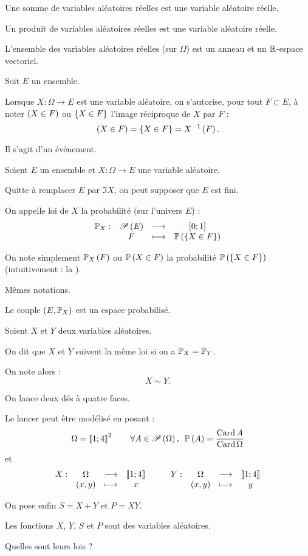 \begin{rem}
Une somme de variables aléatoires réelles est une variable aléatoire réelle.

Un produit de variables aléatoires réelles est une variable aléatoire réelle.

L'ensemble des variables aléatoires réelles (sur \(\Omega\)) est un anneau et un \(\R\)-espace vectoriel.
\end{rem}

\begin{nota}
Soit \(E\) un ensemble.

Lorsque \(X:\Omega\to E\) est une variable aléatoire, on s'autorise, pour tout \(F\subset E\), à noter \(\paren{X\in F}\) ou \(\accol{X\in F}\) l'image réciproque de \(X\) par \(F\) : \[\paren{X\in F}=\accol{X\in F}=X\inv\paren{F}.\]

Il s'agit d'un événement.
\end{nota}

\begin{defi}
Soient \(E\) un ensemble et \(X:\Omega\to E\) une variable aléatoire.

Quitte à remplacer \(E\) par \(\Im X\), on peut supposer que \(E\) est fini.

On appelle loi de \(X\) la probabilité (sur l'univers \(E\)) : \[\fonction{\prem_X}{\P{E}}{\intervii{0}{1}}{F}{\proba{\accol{X\in F}}}\]

On note simplement \(\probacond{F}{X}\) ou \(\proba{X\in F}\) la probabilité \(\proba{\accol{X\in F}}\) (intuitivement : la ).
\end{defi}

\begin{rem}
Mêmes notations.

Le couple \(\groupe{E}[\prem_X]\) est un espace probabilisé.
\end{rem}

\begin{defi}
Soient \(X\) et \(Y\) deux variables aléatoires.

On dit que \(X\) et \(Y\) suivent la même loi si on a \(\prem_X=\prem_Y\).

On note alors : \[X\sim Y.\]
\end{defi}

\begin{exoex}
On lance deux dés à quatre faces.

Le lancer peut être modélisé en posant : \[\Omega=\interventierii{1}{4}^2\qquad\quantifs{\forall A\in\P{\Omega}}\proba{A}=\dfrac{\Card A}{\Card\Omega}\] et \[\fonction{X}{\Omega}{\interventierii{1}{4}}{\paren{x,y}}{x}\qquad\fonction{Y}{\Omega}{\interventierii{1}{4}}{\paren{x,y}}{y}\]

On pose enfin \(S=X+Y\) et \(P=XY\).

Les fonctions \(X\), \(Y\), \(S\) et \(P\) sont des variables aléatoires.

Quelles sont leurs lois ?
\end{exoex}

